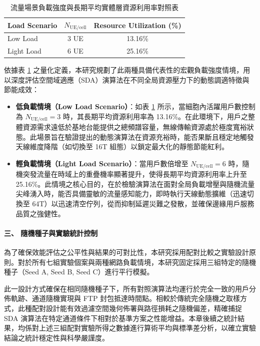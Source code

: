 \begin{table}[htbp]
\centering
\caption{流量場景負載強度與長期平均實體層資源利用率對照表}
\label{tab:load_scenarios}
\renewcommand{\arraystretch}{1.2}
\begin{tabular}{lcc}
\hline
\textbf{Load Scenario} & \textbf{$N_{\text{UE/cell}}$} & \textbf{Resource Utilization (\%)} \\ \hline
Low Load             & 3 UE                                      & 13.16\%                                        \\
Light Load           & 6 UE                                      & 25.16\%                                        \\ \hline
\end{tabular}
\end{table}

依據表 \ref{tab:load_scenarios} 之量化定義，本研究規劃了此兩種具備代表性的宏觀負載強度情境，用以深度評估空間域適應（SDA）演算法在不同全局資源壓力下的動態調適特徵與節能成效：

\begin{itemize}
    \item \textbf{低負載情境（Low Load Scenario）}：如表 \ref{tab:load_scenarios} 所示，當細胞內活躍用戶數控制為 $N_{\text{UE/cell}} = 3$ 時，其長期平均資源利用率為 13.16\%。在此環境下，用戶之整體資源需求遠低於基地台能提供之總頻譜容量，無線傳輸資源處於極度寬裕狀態。此場景旨在驗證提出的動態演算法在資源充裕時，能否果斷且穩定地觸發天線維度降階（如切換至 16T 組態）以鎖定最大化的靜態節能紅利。
    \item \textbf{輕負載情境（Light Load Scenario）}：當用戶數倍增至 $N_{\text{UE/cell}} = 6$ 時，隨機突發流量在時域上的重疊機率顯著提升，使得長期平均資源利用率上升至 25.16\%。此情境之核心目的，在於檢驗演算法在面對全局負載增壓與隨機流量尖峰湧入時，能否具備靈敏的流量感知能力，即時執行天線動態擴維（迅速切換至 64T）以迅速清空佇列，從而抑制延遲災難之發散，並確保邊緣用戶服務品質之強健性。
\end{itemize}

\paragraph{三、 隨機種子與實驗統計控制}
為了確保效能評估之公平性與結果的可對比性，本研究採用配對比較之實驗設計原則。對於所有七組實驗個案與兩種網路負載情境，本研究固定採用三組特定的隨機種子（Seed A, Seed B, Seed C）進行平行模擬。

此一設計方式確保在相同隨機種子下，所有對照演算法均運行於完全一致的用戶分佈軌跡、通道隨機實現與 FTP 封包抵達時間點。相較於傳統完全隨機之取樣方式，此種配對設計能有效過濾空間幾何佈署與路徑損耗之隨機偏差，精確捕捉 SDA 演算法在特定通道條件下相對於基準方案之性能增益。本章後續之統計結果，均係對上述三組配對實驗所得之數據進行算術平均與標準差分析，以確立實驗結論之統計穩定性與科學嚴謹度。


